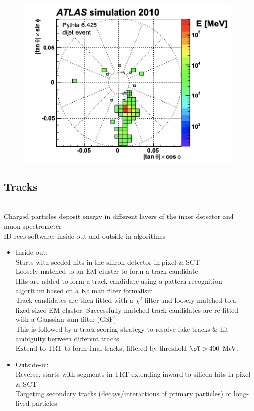 \documentclass[../thesis.tex]{subfiles}
\begin{document}
\begin{figure}[!htbp]
\begin{center}
\includegraphics[width=\linewidth]{fig/reco_topo1.png}
\caption{\label{fig:reco:topo1}}
\end{center}
\end{figure}

\subsection{Tracks}
\citep{reco:track}\\
Charged particles deposit energy in different layers of the inner detector and muon spectrometer\\
ID reco software: inside-out and outside-in algorithms\\
\begin{itemize}

\item Inside-out: \citep{reco:io}\\
Starts with seeded hits in the silicon detector in pixel \& SCT\\
Loosely matched to an EM cluster to form a track candidate\\
Hits are added to form a track candidate using a pattern recognition algorithm based on a Kalman filter formalism \citep{reco:kalman}\\
Track candidates are then fitted with a $\chi^2$ filter \citep{reco:track_chi2} and loosely matched to a fixed-sized EM cluster. Successfully matched track candidates are re-fitted with a Gaussian-sum filter (GSF) \citep{reco:track_gsf}\\
This is followed by a track scoring strategy to resolve fake tracks \& hit ambiguity between different tracks \citep{reco:track_ambiguity}\\
Extend to TRT to form final tracks, filtered by threshold $\pT > 400$ MeV.\\
\item Outside-in: \citep{reco:oi}\\
Reverse, starts with segments in TRT extending inward to silicon hits in pixel \& SCT\\
Targeting secondary tracks (decays/interactions of primary particles) or long-lived particles
\end{itemize}
\end{document}
